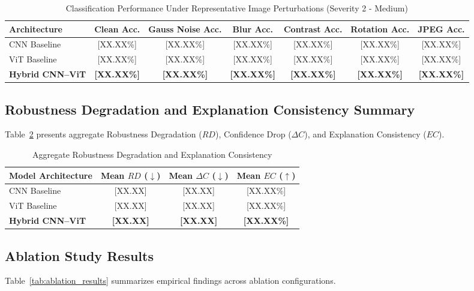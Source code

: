 \documentclass[conference]{IEEEtran}
\begin{document}
\begin{table}[t]
\caption{Classification Performance Under Representative Image Perturbations (Severity 2 - Medium)}
\label{tab:perturbation_results}
\centering
\begin{tabular}{lcccccc}
\toprule
\textbf{Architecture} & \textbf{Clean Acc.} & \textbf{Gauss Noise Acc.} & \textbf{Blur Acc.} & \textbf{Contrast Acc.} & \textbf{Rotation Acc.} & \textbf{JPEG Acc.} \\
\midrule
CNN Baseline          & [XX.XX\%] & [XX.XX\%] & [XX.XX\%] & [XX.XX\%] & [XX.XX\%] & [XX.XX\%] \\
ViT Baseline          & [XX.XX\%] & [XX.XX\%] & [XX.XX\%] & [XX.XX\%] & [XX.XX\%] & [XX.XX\%] \\
\textbf{Hybrid CNN--ViT} & \textbf{[XX.XX\%]} & \textbf{[XX.XX\%]} & \textbf{[XX.XX\%]} & \textbf{[XX.XX\%]} & \textbf{[XX.XX\%]} & \textbf{[XX.XX\%]} \\
\bottomrule
\end{tabular}
\end{table}

\subsection{Robustness Degradation and Explanation Consistency Summary}
Table~\ref{tab:rd_ec_summary} presents aggregate Robustness Degradation ($RD$), Confidence Drop ($\Delta C$), and Explanation Consistency ($EC$).

\begin{table}[htbp]
\caption{Aggregate Robustness Degradation and Explanation Consistency}
\label{tab:rd_ec_summary}
\centering
\begin{tabular}{lccc}
\toprule
\textbf{Model Architecture} & \textbf{Mean $RD$ ($\downarrow$)} & \textbf{Mean $\Delta C$ ($\downarrow$)} & \textbf{Mean $EC$ ($\uparrow$)} \\
\midrule
CNN Baseline          & [XX.XX] & [XX.XX] & [XX.XX\%] \\
ViT Baseline          & [XX.XX] & [XX.XX] & [XX.XX\%] \\
\textbf{Hybrid CNN--ViT} & \textbf{[XX.XX]} & \textbf{[XX.XX]} & \textbf{[XX.XX\%]} \\
\bottomrule
\end{tabular}
\end{table}

\subsection{Ablation Study Results}
Table~\ref{tab:ablation_results} summarizes empirical findings across ablation configurations.
\end{document}
